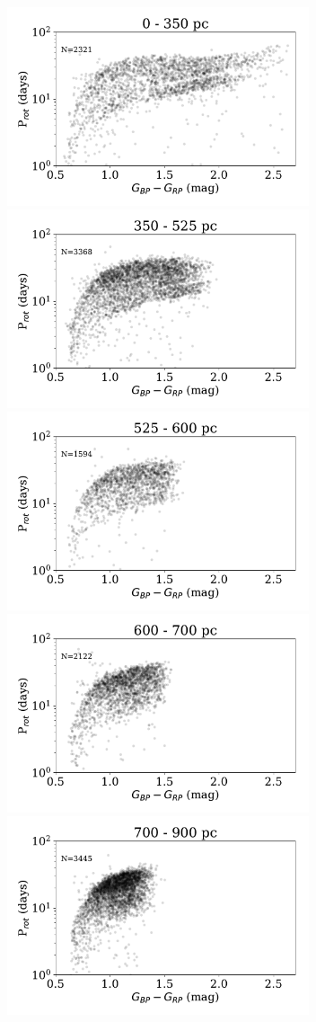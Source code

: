 \documentclass[preprint2]{aastex62}
\begin{document}
\begin{figure}[]
\centering
\includegraphics[width=3.5in]{../figures/rot_dist_0}
\includegraphics[width=3.5in]{../figures/rot_dist_350}
\includegraphics[width=3.5in]{../figures/rot_dist_525}
\includegraphics[width=3.5in]{../figures/rot_dist_600}
\includegraphics[width=3.5in]{../figures/rot_dist_700}

\end{figure}
\end{document}
